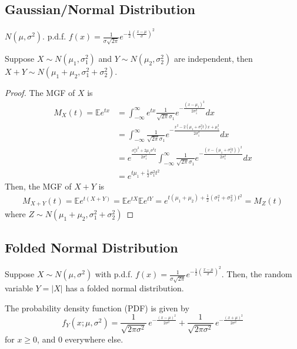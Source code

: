 \documentclass[11pt]{elegantbook}
\begin{document}
\subsection{Gaussian/Normal Distribution}
$N(\mu,\sigma^2)$. p.d.f. ${\displaystyle f(x)={\frac {1}{\sigma {\sqrt {2\pi }}}}e^{-{\frac {1}{2}}\left({\frac {x-\mu }{\sigma }}\right)^{2}}}$
\begin{theorem}
Suppose $X\sim N(\mu_1,\sigma_1^2)$ and $Y\sim N(\mu_2,\sigma_2^2)$ are independent, then $X+Y\sim N(\mu_1+\mu_2,\sigma_1^2+\sigma_2^2)$.
\end{theorem}
\begin{proof}
The MGF of $X$ is
\begin{equation}
    \begin{aligned}
        M_X(t)=\mathbb{E}e^{tx}&=\int_{-\infty}^{\infty}e^{tx}\frac{1}{\sqrt{2\pi}\sigma_1}e^{-\frac{(x-\mu_1)^2}{2\sigma_1^2}}dx\\
        &=\int_{-\infty}^{\infty}\frac{1}{\sqrt{2\pi}\sigma_1}e^{-\frac{x^2-2(\mu_1+\sigma_1^2t)x+\mu_1^2}{2\sigma_1^2}}dx\\
        &=e^{\frac{\sigma_1^4t^2+2\mu_1\sigma^2t}{2\sigma_1^2}}\int_{-\infty}^{\infty}\frac{1}{\sqrt{2\pi}\sigma_1}e^{-\frac{(x-(\mu_1+\sigma_1^2t))^2}{2\sigma_1^2}}dx\\
        &=e^{t\mu_1+\frac{1}{2}\sigma_1^2t^2}
    \end{aligned}
    \nonumber
\end{equation}
Then, the MGF of $X+Y$ is
\begin{equation}
    \begin{aligned}
        M_{X+Y}(t)=\mathbb{E}e^{t(X+Y)}=\mathbb{E}e^{tX}\mathbb{E}e^{tY}=e^{t(\mu_1+\mu_2)+\frac{1}{2}(\sigma_1^2+\sigma_2^2)t^2}=M_{Z}(t)
    \end{aligned}
    \nonumber
\end{equation}
where $Z\sim N(\mu_1+\mu_2,\sigma_1^2+\sigma_2^2)$
\end{proof}

\subsection{Folded Normal Distribution}
Suppose $X\sim N(\mu,\sigma^2)$ with p.d.f. ${\displaystyle f(x)={\frac {1}{\sigma {\sqrt {2\pi }}}}e^{-{\frac {1}{2}}\left({\frac {x-\mu }{\sigma }}\right)^{2}}}$. Then, the random variable $Y=|X|$ has a folded normal distribution.

The probability density function (PDF) is given by
$${\displaystyle f_{Y}(x;\mu ,\sigma ^{2})={\frac {1}{\sqrt {2\pi \sigma ^{2}}}}\,e^{-{\frac {(x-\mu )^{2}}{2\sigma ^{2}}}}+{\frac {1}{\sqrt {2\pi \sigma ^{2}}}}\,e^{-{\frac {(x+\mu )^{2}}{2\sigma ^{2}}}}}$$
for $x \geq 0$, and $0$ everywhere else.
\end{document}
